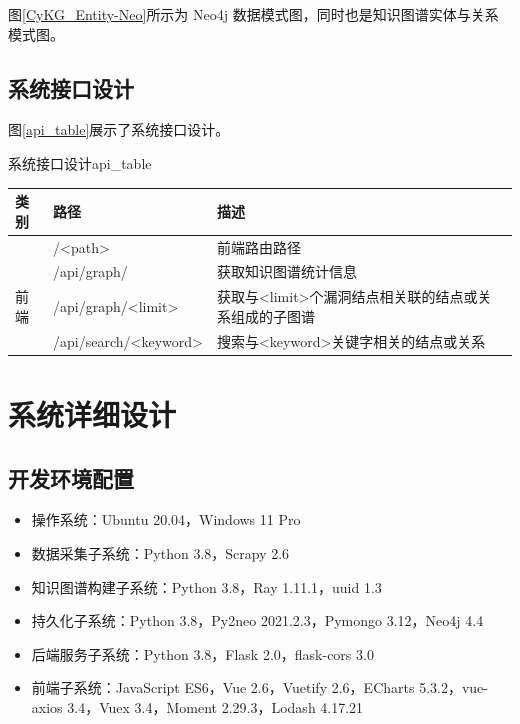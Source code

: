 \documentclass[a4paper,AutoFakeBold,oneside,12pt]{book}
\begin{document}

图\ref{CyKG_Entity-Neo}所示为 Neo4j 数据模式图，同时也是知识图谱实体与关系模式图。


\subsection{系统接口设计}

图\ref{api_table}展示了系统接口设计。
\begin{bupttable}{系统接口设计}{api_table}
	\begin{tabularx}{\textwidth}{llX}
		\toprule
		\textbf{类别} & \textbf{路径}         & \textbf{描述}                                         \\ \midrule
		              & /<path>               & 前端路由路径                                          \\ \cmidrule(l){2-3}
		              & /api/graph/           & 获取知识图谱统计信息                                  \\ \cmidrule(l){2-3}
		前端          & /api/graph/<limit>    & 获取与<limit>个漏洞结点相关联的结点或关系组成的子图谱 \\ \cmidrule(l){2-3}
		              & /api/search/<keyword> & 搜索与<keyword>关键字相关的结点或关系                 \\ \bottomrule %
	\end{tabularx}
\end{bupttable}

\section{系统详细设计}

\subsection{开发环境配置}

\begin{itemize}
	\item 操作系统：Ubuntu 20.04，Windows 11 Pro
	\item 数据采集子系统：Python 3.8，Scrapy 2.6
	\item 知识图谱构建子系统：Python 3.8，Ray 1.11.1，uuid 1.3
	\item 持久化子系统：Python 3.8，Py2neo 2021.2.3，Pymongo 3.12，Neo4j 4.4
	\item 后端服务子系统：Python 3.8，Flask 2.0，flask-cors 3.0
	\item 前端子系统：JavaScript ES6，Vue 2.6，Vuetify 2.6，ECharts 5.3.2，vue-axios 3.4，Vuex 3.4，Moment 2.29.3，Lodash 4.17.21
\end{itemize}
\end{document}
